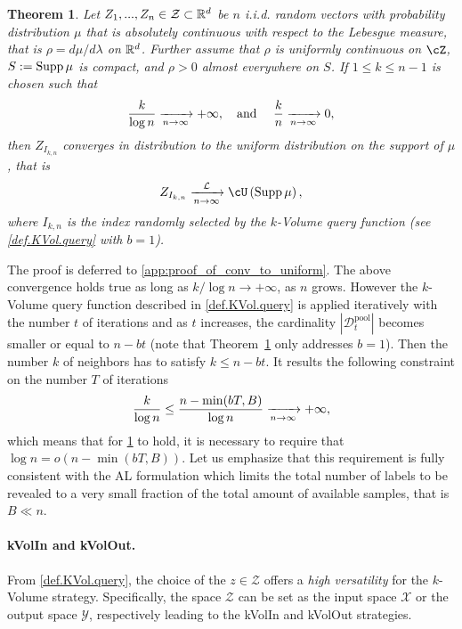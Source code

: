 \documentclass[twoside]{article}
\newtheorem{thm}{Theorem}
\theoremstyle{definition}
\theoremstyle{remark}
\newcommand{\kvv}{z} %
\newcommand{\KVV}{Z} %
\newcommand{\Dpool}{\mathcal{D}^{\mathrm{pool}}}
\newcommand{\paren}[1]{\left( #1 \right)}
\begin{document}
\begin{thm}\label{thm:conv_to_uniform}
    Let $\KVV_1,...,\KVV_n \in\mathcal{Z}\subset \R^d$ be $n$ \textit{i.i.d.} random vectors with probability distribution $\mu$ that is absolutely continuous with respect to the Lebesgue measure, that is $\rho = d\mu/d\lambda$ on $\mathbb{R}^d$.
    Further assume that $\rho$ is uniformly continuous on $\cZ$, $S:=\operatorname{Supp}\mu$ is compact, and $\rho>0$ almost everywhere on $S$.
    If $1\leq k \leq n-1$ is chosen such that
    \begin{align*}
        \frac{k}{\log n}\xrightarrow[n\to\infty]{} +\infty,\quad \mbox{and }\quad  \frac{k}{n} \xrightarrow[n\to\infty]{} 0,
    \end{align*}
    then $\KVV_{I_{k,n}}$ converges in distribution to the uniform distribution on the support of $\mu$, that is 
    \begin{equation*}
        \KVV_{I_{k,n}} \xra[\mathcal{L}]{n\to\infty} \cU\pa{\Supp\mu},
    \end{equation*}
    where $I_{k,n}$ is the index randomly selected by the $k$-Volume query function (see \cref{def.KVol.query} with $b=1$).
\end{thm}
%
%
The proof is deferred to \cref{app:proof_of_conv_to_uniform}. The above convergence holds true as long as $k/\log n \to +\infty$, as $n$ grows. However the $k$-Volume query function described in \cref{def.KVol.query} is applied iteratively with the number $t$ of iterations and as $t$ increases, the cardinality $|\Dpool_t|$ becomes smaller or equal to $n - b t$ (note that Theorem~\ref{thm:conv_to_uniform} only addresses $b=1$). Then the number $k$ of neighbors has to satisfy $k\leq n - bt$. It results the following constraint on the number $T$ of iterations
\begin{align*}
\frac{k}{\log n} \leq   \frac{n - \min(bT,B)}{ \log n}\xrightarrow[n\to\infty]{} +\infty,
\end{align*}
which means that for \cref{thm:conv_to_uniform} to hold, it is necessary to require that $\log n = o\paren{ n - \min(bT,B)}$. Let us emphasize that this requirement is fully consistent with the AL formulation which limits the total number of labels to be revealed to a very small fraction of the total amount of available samples, that is $B\ll n$. 






\paragraph{kVolIn and kVolOut.}
%
From \cref{def.KVol.query}, the choice of the $\kvv \in\mathcal{Z}$ offers a \emph{high versatility} for the $k$-Volume strategy.
%
Specifically, the space $\mathcal{Z}$ can be set as the input space $\mathcal{X}$ or the output space $\mathcal{Y}$, respectively leading to the kVolIn and kVolOut strategies.
%
\end{document}
